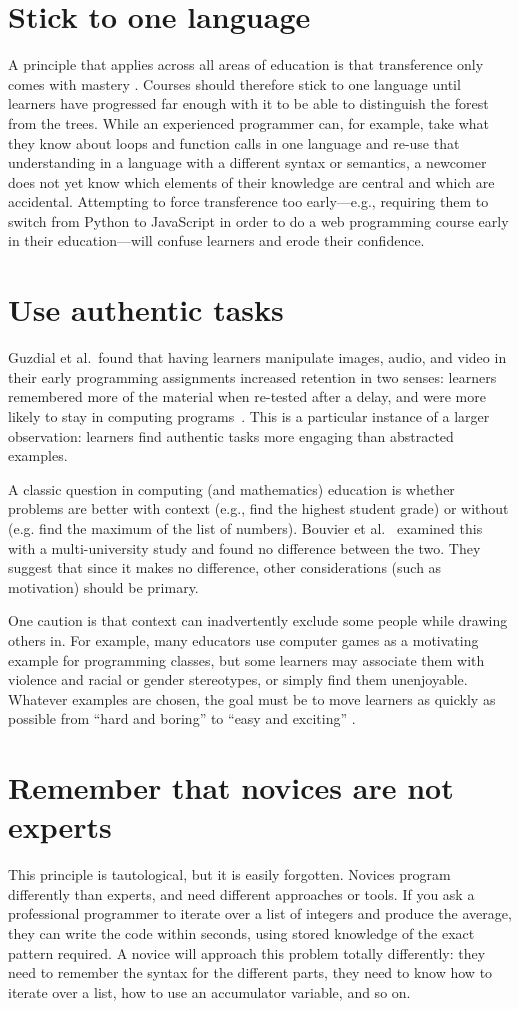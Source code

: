 \documentclass[10pt,letterpaper]{article}
\newcommand{\rulemajor}[2]{\section{#1}\label{#2}}
\begin{document}
\rulemajor{Stick to one language}{one-language}

A principle that applies across all areas of education is that
transference only comes with mastery \cite{gick-holyoak}.
Courses should therefore stick to one language until learners have progressed far enough with it
to be able to distinguish the forest from the trees.
While an experienced programmer can,
for example,
take what they know about loops and function calls in one language
and re-use that understanding in a language with a different syntax or semantics,
a newcomer does not yet know which elements of their knowledge are central
and which are accidental.
Attempting to force transference too early---e.g.,
requiring them to switch from Python to JavaScript in order to do a web programming course
early in their education---will confuse learners and erode their confidence.

\rulemajor{Use authentic tasks}{authentic-tasks}

Guzdial et al.\ found that having learners manipulate images, audio, and video
in their early programming assignments
increased retention in two senses:
learners remembered more of the material when re-tested after a delay,
and were more likely to stay in computing programs~\cite{guzdial-media}.
This is a particular instance of a larger observation:
learners find authentic tasks more engaging than abstracted examples.

A classic question in computing (and mathematics) education
is whether problems are better with context (e.g., find the highest student grade)
or without (e.g. find the maximum of the list of numbers).
Bouvier et al.~\cite{bouvier-context} examined this with a multi-university study
and found no difference between the two.
They suggest that since it makes no difference,
other considerations (such as motivation) should be primary.

One caution is that context can inadvertently exclude some people while drawing others in.
For example,
many educators use computer games as a motivating example for programming classes,
but some learners may associate them with violence and racial or gender stereotypes,
or simply find them unenjoyable.
Whatever examples are chosen,
the goal must be to move learners as quickly as possible
from ``hard and boring'' to ``easy and exciting'' \cite{repenning}.

\rulemajor{Remember that novices are not experts}{not-experts}

This principle is tautological, but it is easily forgotten.
Novices program differently than experts,
and need different approaches or tools.
If you ask a professional programmer to iterate over a list of integers and produce the average,
they can write the code within seconds,
using stored knowledge of the exact pattern required.
A novice will approach this problem totally differently:
they need to remember the syntax for the different parts,
they need to know how to iterate over a list,
how to use an accumulator variable,
and so on.
\end{document}
